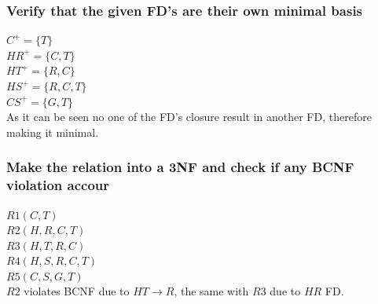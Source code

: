 \documentclass[12pt, a4paper]{article}
\begin{document}
					\subsubsection{Verify that the given FD's are their own minimal basis}
						$C^+=\{T\}$\\
						$HR^+=\{C,T\}$\\
						$HT^+=\{R,C\}$\\
						$HS^+=\{R,C,T\}$\\
						$CS^+=\{G,T\}$\\
						As it can be seen no one of the FD's closure result in another FD, therefore making it minimal.
					\subsubsection{Make the relation into a 3NF and check if any BCNF violation accour}
						$R1(C,T)$\\
						$R2(H,R,C,T)$\\
						$R3(H,T,R,C)$\\
						$R4(H,S,R,C,T)$\\
						$R5(C,S,G,T)$\\
						$R2$ violates BCNF due to $HT\rightarrow R$, the same with $R3$ due to $HR$ FD.
				
\end{document}

